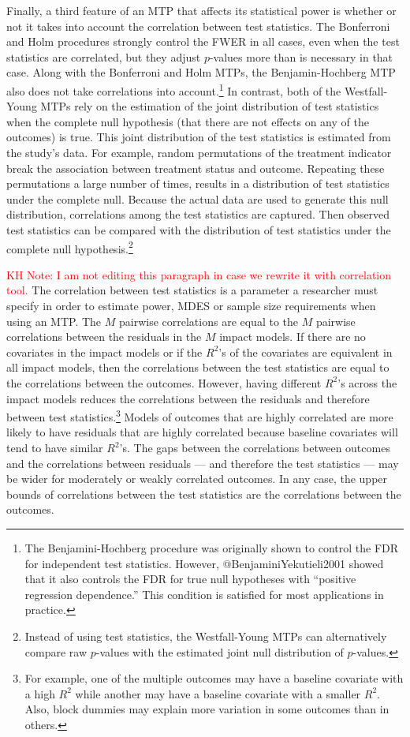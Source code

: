 \documentclass[
]{article}
\begin{document}
Finally, a third feature of an MTP that affects its statistical power is
whether or not it takes into account the correlation between test
statistics. The Bonferroni and Holm procedures strongly control the FWER
in all cases, even when the test statistics are correlated, but they
adjust \(p\)-values more than is necessary in that case. Along with the
Bonferroni and Holm MTPs, the Benjamin-Hochberg MTP also does not take
correlations into
account.\footnote{The Benjamini-Hochberg procedure was originally shown to control the FDR for independent test statistics. However, @BenjaminiYekutieli2001 showed that it also controls the FDR for true null hypotheses with “positive regression dependence.” This condition is satisfied
for most applications in practice.} In contrast, both of the
Westfall-Young MTPs rely on the estimation of the joint distribution of
test statistics when the complete null hypothesis (that there are not
effects on any of the outcomes) is true. This joint distribution of the
test statistics is estimated from the study's data. For example, random
permutations of the treatment indicator break the association between
treatment status and outcome. Repeating these permutations a large
number of times, results in a distribution of test statistics under the
complete null. Because the actual data are used to generate this null
distribution, correlations among the test statistics are captured. Then
observed test statistics can be compared with the distribution of test
statistics under the complete null
hypothesis.\footnote{Instead of using test statistics, the Westfall-Young MTPs can alternatively compare raw $p$-values with the estimated joint null distribution of $p$-values.}

\textcolor{red}{KH Note: I am not editing this paragraph in case we rewrite it with correlation tool.}
The correlation between test statistics is a parameter a researcher must
specify in order to estimate power, MDES or sample size requirements
when using an MTP. The \(M\) pairwise correlations are equal to the
\(M\) pairwise correlations between the residuals in the \(M\) impact
models. If there are no covariates in the impact models or if the
\(R^2\)'s of the covariates are equivalent in all impact models, then
the correlations between the test statistics are equal to the
correlations between the outcomes. However, having different \(R^2\)'s
across the impact models reduces the correlations between the residuals
and therefore between test
statistics.\footnote{For example, one of the multiple outcomes may have a baseline covariate with a high $R^2$ while another may have a baseline covariate with
a smaller $R^2$. Also, block dummies may explain more variation in some outcomes than in others.}
Models of outcomes that are highly correlated are more likely to have
residuals that are highly correlated because baseline covariates will
tend to have similar \(R^2\)'s. The gaps between the correlations
between outcomes and the correlations between residuals --- and
therefore the test statistics --- may be wider for moderately or weakly
correlated outcomes. In any case, the upper bounds of correlations
between the test statistics are the correlations between the outcomes.
\end{document}
